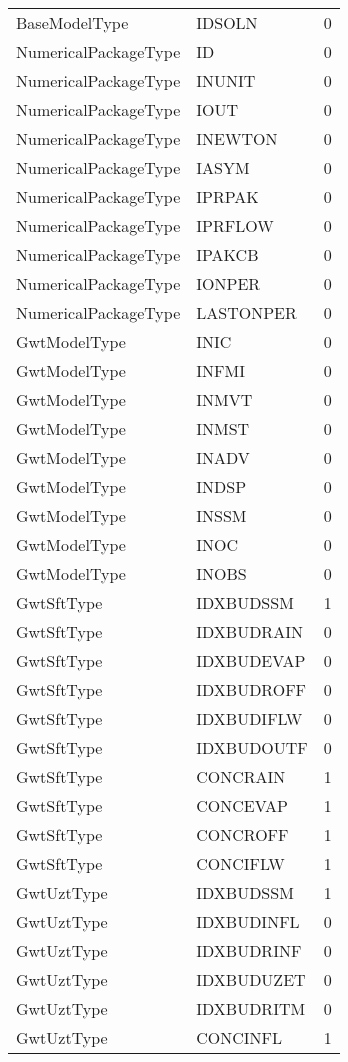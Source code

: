 \begin{longtable}{p{6cm} p{4cm} p{2cm} }
BaseModelType &  IDSOLN & 0 \\ 
NumericalPackageType &  ID & 0 \\ 
NumericalPackageType &  INUNIT & 0 \\ 
NumericalPackageType &  IOUT & 0 \\ 
NumericalPackageType &  INEWTON & 0 \\ 
NumericalPackageType &  IASYM & 0 \\ 
NumericalPackageType &  IPRPAK & 0 \\ 
NumericalPackageType &  IPRFLOW & 0 \\ 
NumericalPackageType &  IPAKCB & 0 \\ 
NumericalPackageType &  IONPER & 0 \\ 
NumericalPackageType &  LASTONPER & 0 \\ 
GwtModelType &  INIC & 0 \\ 
GwtModelType &  INFMI & 0 \\ 
GwtModelType &  INMVT & 0 \\ 
GwtModelType &  INMST & 0 \\ 
GwtModelType &  INADV & 0 \\ 
GwtModelType &  INDSP & 0 \\ 
GwtModelType &  INSSM & 0 \\ 
GwtModelType &   INOC  & 0 \\ 
GwtModelType &  INOBS & 0 \\ 
GwtSftType &  IDXBUDSSM & 1 \\ 
GwtSftType &  IDXBUDRAIN & 0 \\ 
GwtSftType &  IDXBUDEVAP & 0 \\ 
GwtSftType &  IDXBUDROFF & 0 \\ 
GwtSftType &  IDXBUDIFLW & 0 \\ 
GwtSftType &  IDXBUDOUTF & 0 \\ 
GwtSftType &  CONCRAIN & 1 \\ 
GwtSftType &  CONCEVAP & 1 \\ 
GwtSftType &  CONCROFF & 1 \\ 
GwtSftType &  CONCIFLW & 1 \\ 
GwtUztType &  IDXBUDSSM & 1 \\ 
GwtUztType &  IDXBUDINFL & 0 \\ 
GwtUztType &  IDXBUDRINF & 0 \\ 
GwtUztType &  IDXBUDUZET & 0 \\ 
GwtUztType &  IDXBUDRITM & 0 \\ 
GwtUztType &  CONCINFL & 1 \\ 

\end{longtable}
